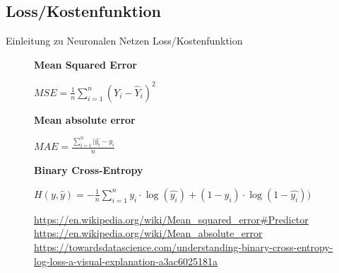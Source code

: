\documentclass{beamer}
\begin{document}
\subsection{Loss/Kostenfunktion}
\begin{frame}[t]{Einleitung zu Neuronalen Netzen}\vspace{4pt}
Loss/Kostenfunktion

\begin{figure}

\center

\textbf{Mean Squared Error}\par\medskip
$MSE=\frac{1}{n}\sum^{n}_{i=1}(Y_i - \hat{Y}_i)^2$

\vspace{2em}
\textbf{Mean absolute error}\par\medskip
$MAE=\frac{\sum^{n}_{i=1}|\hat{y_i}- y_i}{n}$

\vspace{2em}
\textbf{Binary Cross-Entropy}\par\medskip
$H(y, \hat{y})=-\frac{1}{n}\sum^{n}_{i=1} y_i\cdot \log({\hat{y_i}}) + (1-y_i)\cdot\log({1-\hat{y_i}}))$
\vspace{1.5em}
\caption{\tiny\url{https://en.wikipedia.org/wiki/Mean_squared_error\#Predictor}
\tiny\url{https://en.wikipedia.org/wiki/Mean_absolute_error}
{\fontsize{5}{6}\selectfont \url{https://towardsdatascience.com/understanding-binary-cross-entropy-log-loss-a-visual-explanation-a3ac6025181a}}
}
\end{figure}
\end{frame}
\end{document}

